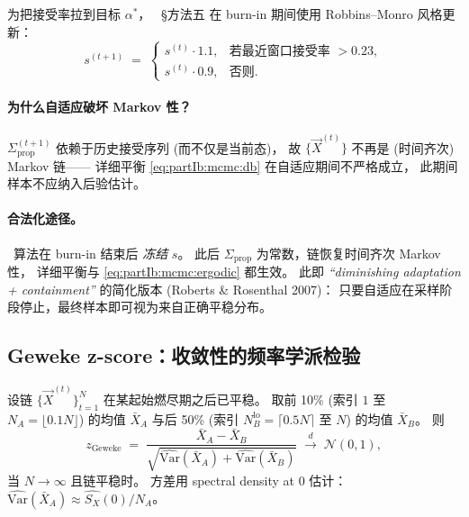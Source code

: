 为把接受率拉到目标 $\alpha^{*}$，
\StatusReport\ §方法五 在 burn-in 期间使用 Robbins--Monro 风格更新：
\begin{equation}
  s^{(t+1)}
  \;=\;
  \begin{cases}
    s^{(t)}\cdot 1.1, & \text{若最近窗口接受率 } > 0.23,\\
    s^{(t)}\cdot 0.9, & \text{否则}.
  \end{cases}
  \label{eq:partIb:mcmc:rm}
\end{equation}

\paragraph{为什么自适应破坏 Markov 性？}
$\Sigma_{\mathrm{prop}}^{(t+1)}$ 依赖于历史接受序列 (而不仅是当前态)，
故 $\{\vec X^{(t)}\}$ 不再是 (时间齐次) Markov 链——
详细平衡 \eqref{eq:partIb:mcmc:db} 在自适应期间不严格成立，
此期间样本不应纳入后验估计。

\paragraph{合法化途径。}
\StatusReport\ 算法在 burn-in 结束后\emph{ 冻结} $s$。
此后 $\Sigma_{\mathrm{prop}}$ 为常数，链恢复时间齐次 Markov 性，
详细平衡与 \eqref{eq:partIb:mcmc:ergodic} 都生效。
此即 \emph{“diminishing adaptation + containment”} 的简化版本
(Roberts \& Rosenthal 2007)：
只要自适应在采样阶段停止，最终样本即可视为来自正确平稳分布。

\subsection{Geweke z-score：收敛性的频率学派检验}
\label{sec:partIb:mcmc:geweke}

\begin{proposition}[Geweke 1992]
\label{prop:partIb:geweke}
设链 $\{\vec X^{(t)}\}_{t=1}^{N}$ 在某起始燃尽期之后已平稳。
取前 10\% (索引 $1$ 至 $N_A=\lfloor 0.1 N\rfloor$) 的均值 $\bar X_A$
与后 50\% (索引 $N_B^{\mathrm{lo}}=\lceil 0.5 N\rceil$ 至 $N$) 的均值 $\bar X_B$。
则
\begin{equation}
  z_{\mathrm{Geweke}}
  \;=\;
  \frac{\bar X_A - \bar X_B}
       {\sqrt{\widehat{\mathrm{Var}}(\bar X_A)
              +\widehat{\mathrm{Var}}(\bar X_B)}}
  \;\xrightarrow{d}\;\mathcal N(0,1),
  \label{eq:partIb:mcmc:geweke}
\end{equation}
当 $N\to\infty$ 且链平稳时。
方差用 spectral density at 0 估计：
$\widehat{\mathrm{Var}}(\bar X_A)\approx \widehat{S_X}(0)/N_A$。
\end{proposition}

